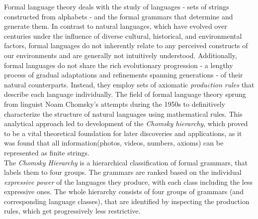 Formal language theory deals with the study of languages - sets of strings constructed from alphabets - and the formal grammars that determine and generate them.
In contrast to natural languages, which have evolved over centuries under the influence of diverse cultural, historical, and environmental factors,
formal languages do not inherently relate to any perceived constructs of our environments and are generally not intuitively understood.
Additionally, formal languages do not share the rich evolutionary progression - a lengthy process of gradual adaptations and refinements spanning generations -
of their natural counterparts. Instead, they employ sets of axiomatic \textit{production rules} that describe each language individually.
The field of formal language theory sprung from linguist Noam Chomsky's attempts during the 1950s to definitively characterize the structure of natural languages
using mathematical rules.\cite{Jiang_Li_Ravikumar_Regan_2009} This analytical approach led to development of the \textit{Chomsky hierarchy}, which proved
to be a vital theoretical foundation for later discoveries and applications, as it was found that all information(photos, videos, numbers, axioms) can be
represented as finite strings.\\

The \textit{Chomsky Hierarchy} is a hierarchical classification of formal grammars, that labels them to four groups. The grammars are ranked based on the
individual \textit{expressive power} of the languages they produce, with each class including the less expressive ones. The whole hierarchy consists of four
groups of grammars (and corresponding language classes), that are identified by inspecting the production rules, which get progressively less restrictive.

